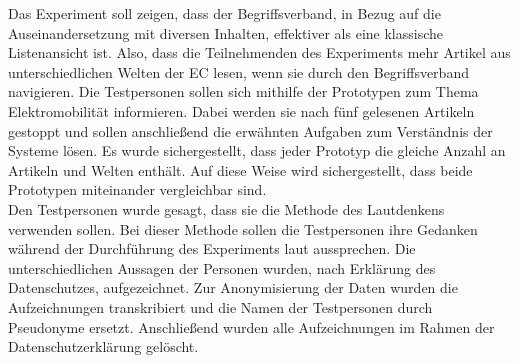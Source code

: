 Das Experiment soll zeigen, dass der Begriffsverband, in Bezug auf die Auseinandersetzung mit diversen Inhalten, effektiver als eine klassische Listenansicht ist.
Also, dass die Teilnehmenden des Experiments mehr Artikel aus unterschiedlichen Welten der \ac{EC} lesen, wenn sie durch den Begriffsverband navigieren.
Die Testpersonen sollen sich mithilfe der Prototypen zum Thema Elektromobilität informieren.
Dabei werden sie nach fünf gelesenen Artikeln gestoppt und sollen anschließend die erwähnten Aufgaben zum Verständnis der Systeme lösen.
Es wurde sichergestellt, dass jeder Prototyp die gleiche Anzahl an Artikeln und Welten enthält.
Auf diese Weise wird sichergestellt, dass beide Prototypen miteinander vergleichbar sind.\\

Den Testpersonen wurde gesagt, dass sie die Methode des Lautdenkens verwenden sollen.
Bei dieser Methode sollen die Testpersonen ihre Gedanken während der Durchführung des Experiments laut aussprechen.
Die unterschiedlichen Aussagen der Personen wurden, nach Erklärung des Datenschutzes, aufgezeichnet.
Zur Anonymisierung der Daten wurden die Aufzeichnungen transkribiert und die Namen der Testpersonen durch Pseudonyme ersetzt.
Anschließend wurden alle Aufzeichnungen im Rahmen der Datenschutzerklärung gelöscht.

